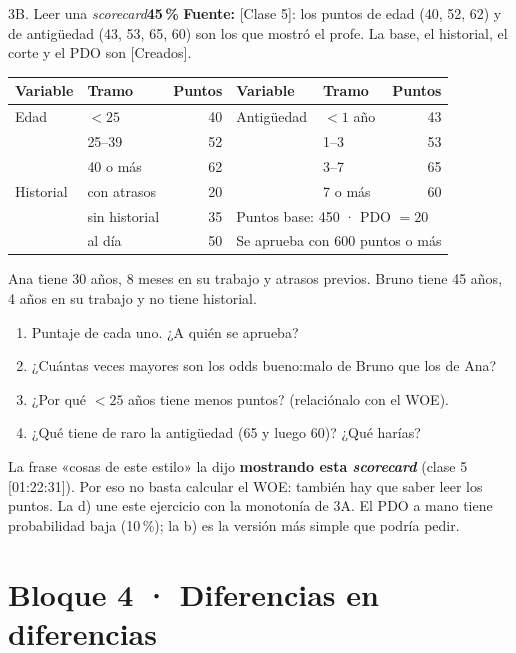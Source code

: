 \documentclass[11pt]{article}
\newcommand{\prob}[1]{\colorbox{red!15}{\textbf{#1}}}
\newcommand{\fuente}[1]{{\small\textcolor{blue!50!black}{\textbf{Fuente:} #1}}\par}
\newcommand{\bloque}[2]{\section*{Bloque #1 · #2}}
\begin{document}
\begin{ej}{3B. Leer una \emph{scorecard}}{\prob{45\,\%}}
\fuente{[Clase 5]: los puntos de edad (40, 52, 62) y de antigüedad (43, 53, 65, 60) son los que mostró el profe. La base, el historial, el corte y el PDO son [Creados].}
\begin{center}\small
\begin{tabular}{llr|llr}\toprule
Variable & Tramo & Puntos & Variable & Tramo & Puntos\\\midrule
Edad & $<25$ & 40 & Antigüedad & $<1$ año & 43\\
 & 25--39 & 52 & & 1--3 & 53\\
 & 40 o más & 62 & & 3--7 & 65\\
Historial & con atrasos & 20 & & 7 o más & 60\\
 & sin historial & 35 & \multicolumn{3}{l}{Puntos base: 450 · PDO $=20$}\\
 & al día & 50 & \multicolumn{3}{l}{Se aprueba con 600 puntos o más}\\\bottomrule
\end{tabular}
\end{center}
Ana tiene 30 años, 8 meses en su trabajo y atrasos previos. Bruno tiene 45 años, 4 años en su trabajo y no tiene historial.
\begin{enumerate}[label=\alph*),itemsep=0pt,topsep=2pt]
\item Puntaje de cada uno. ¿A quién se aprueba?
\item ¿Cuántas veces mayores son los odds bueno:malo de Bruno que los de Ana?
\item ¿Por qué $<25$ años tiene menos puntos? (relaciónalo con el WOE).
\item ¿Qué tiene de raro la antigüedad (65 y luego 60)? ¿Qué harías?
\end{enumerate}
\end{ej}
\begin{porque}
La frase «cosas de este estilo» la dijo \textbf{mostrando esta \emph{scorecard}} (clase 5 [01:22:31]). Por eso no basta calcular el WOE: también hay que saber leer los puntos. La d) une este ejercicio con la monotonía de 3A. El PDO a mano tiene probabilidad baja (10\,\%); la b) es la versión más simple que podría pedir.
\end{porque}

\bloque{4}{Diferencias en diferencias}
\end{document}
